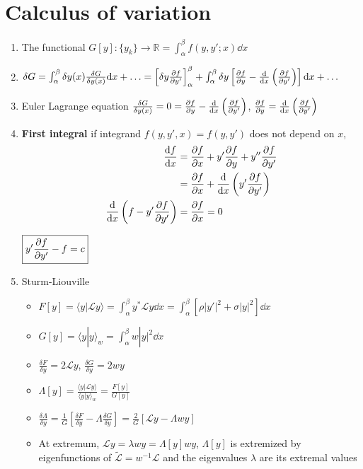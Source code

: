 \documentclass{article}
\theoremstyle{remark}
\theoremstyle{remark}
\begin{document}
    \section*{Calculus of variation}
    \begin{enumerate}
        \item The functional $G[y] : \{y_k\}\rightarrow\mathbb{R}=\int_\alpha^\beta f(y,y';x)\dd x$
        \item $\delta G=\int_\alpha^\beta\delta y(x)\frac{\delta G}{\delta y(x)}\dd x+\ldots = \left[\delta y\pdv{f}{y'}\right]_{\alpha}^{\beta}+\int_{\alpha}^{\beta}\delta y\left[\pdv{f}{y}-\dv{x}\left(\pdv{f}{y'}\right)\right]\dd x + \ldots$
        \item Euler Lagrange equation $\frac{\delta G}{\delta y(x)} = 0 = \pdv{f}{y}-\dv{x}\left(\pdv{f}{y'}\right)$, $\pdv{f}{y} = \dv{x}\left(\pdv{f}{y'}\right)$
        \item \textbf{First integral} if integrand $f(y,y',x)=f(y,y')$ does not depend on $x$,\begin{align*}
            \dv{f}{x}&=\pdv{f}{x}+y'\pdv{f}{y}+y''\pdv{f}{y'}\\
                     &=\pdv{f}{x}+\dv{x}\left(y'\pdv{f}{y'}\right)\\
            \dv{x}\left(f-y'\pdv{f}{y'}\right)&=\pdv{f}{x}=0\\
        \end{align*}\begin{center}
            $\boxed{y'\pdv{f}{y'}-f=c}$
        \end{center}
        \item Sturm-Liouville\begin{itemize}
            \item $F[y]=\langle y|\mathcal{L}y\rangle = \int_\alpha^\beta y^*\mathcal{L}y \dd x = \int_\alpha^\beta \left[\rho|y'|^2+\sigma |y|^2\right] \dd x$
            \item $G[y]= \langle y|y\rangle_w = \int_\alpha^\beta w|y|^2 \dd x$
            \item $\frac{\delta F}{\delta y}=2\mathcal{L}y$, $\frac{\delta G}{\delta y}=2wy$
            \item $\Lambda[y] = \frac{\langle y|\mathcal{L}y\rangle}{\langle y|y\rangle_w} =\frac{F[y]}{G[y]}$
            \item $\frac{\delta \Lambda}{\delta y}=\frac{1}{G}\left[\frac{\delta F}{\delta y}-\Lambda \frac{\delta G}{\delta y}\right]=\frac{2}{G}\left[\mathcal{L}y-\Lambda wy\right]$
            \item At extremum, $\mathcal{L}y=\lambda wy=\Lambda[y] wy$, $\Lambda[y]$ is extremized by eigenfunctions of $\tilde{\mathcal{L}}=w^{-1}\mathcal{L}$ and the eigenvalues $\lambda$ are its extremal values

\end{itemize}
\end{enumerate}
\end{document}
